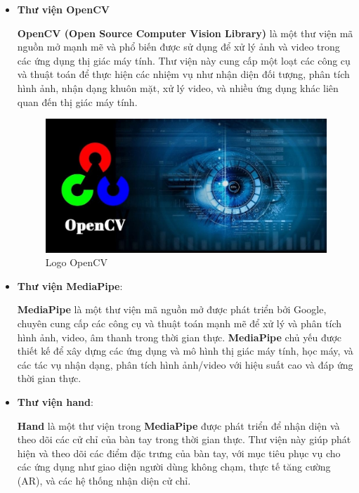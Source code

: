 \begin{itemize}
    \item \textbf{Thư viện OpenCV}
    
    \begin{itemize}
        \textbf{OpenCV (Open Source Computer Vision Library)} là một thư viện mã nguồn mở mạnh mẽ và phổ biến được sử dụng để xử lý ảnh và video trong các ứng dụng thị giác máy tính. Thư viện này cung cấp một loạt các công cụ và thuật toán để thực hiện các nhiệm vụ như nhận diện đối tượng, phân tích hình ảnh, nhận dạng khuôn mặt, xử lý video, và nhiều ứng dụng khác liên quan đến thị giác máy tính.
    \end{itemize}

    \begin{figure}[H]  %
    \centering
    \includegraphics[width=0.75\linewidth]{Chapter2/OpenCV-la-gi-1.jpeg}
    \caption{Logo OpenCV ~\cite{image}}
    \label{fig:baitoan}
    \end{figure}

    \item \textbf{Thư viện MediaPipe}:

    \begin{itemize}
         \textbf{MediaPipe} là một thư viện mã nguồn mở được phát triển bởi Google, chuyên cung cấp các công cụ và thuật toán mạnh mẽ để xử lý và phân tích hình ảnh, video, âm thanh trong thời gian thực. \textbf{MediaPipe} chủ yếu được thiết kế để xây dựng các ứng dụng và mô hình thị giác máy tính, học máy, và các tác vụ nhận dạng, phân tích hình ảnh/video với hiệu suất cao và đáp ứng thời gian thực.
    \end{itemize}

    \item \textbf{Thư viện hand}:

    \begin{itemize}
        \textbf{Hand} là một thư viện trong \textbf{MediaPipe} được phát triển để nhận diện và theo dõi các cử chỉ của bàn tay trong thời gian thực. Thư viện này giúp phát hiện và theo dõi các điểm đặc trưng của bàn tay, với mục tiêu phục vụ cho các ứng dụng như giao diện người dùng không chạm, thực tế tăng cường (AR), và các hệ thống nhận diện cử chỉ.
    \end{itemize}


\end{itemize}
